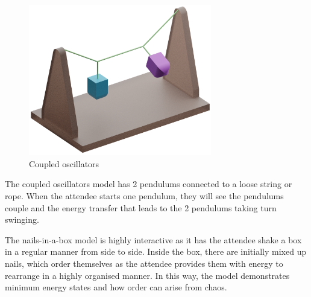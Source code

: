 \documentclass[12pt, a4paper]{article}
\begin{document}
\begin{figure}[H]
    \centering
    \includegraphics[width=8cm]{CPO-assembly.png}
    \caption{Coupled oscillators}
    \label{}
\end{figure}
The coupled oscillators model has 2 pendulums connected to a loose string or rope. When the attendee starts one pendulum, they will see the pendulums couple and the energy transfer that leads to the 2 pendulums taking turn swinging.

The nails-in-a-box model is highly interactive as it has the attendee shake a box in a regular manner from side to side. Inside the box, there are initially mixed up nails, which order themselves as the attendee provides them with energy to rearrange in a highly organised manner. In this way, the model demonstrates minimum energy states and how order can arise from chaos. 
\end{document}
